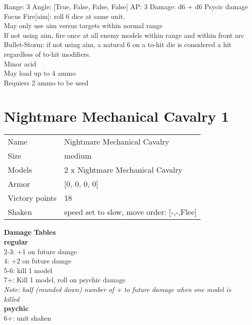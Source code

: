 Range: 3  Angle: [True, False, False, False] AP: 3 Damage: d6 + d6 Psycic damage \\
Focus Fire[aim]: roll 6 dice at same unit.\\ 
May only use aim versus targets within normal range\\ 
If not using aim, fire once at all enemy models within range and within front arc\\ 
Bullet-Storm: if not using aim, a natural 6 on a to-hit die is considered a hit regardless of to-hit modifiers.\\ 
Minor acid\\ 
May load up to 4 ammo\\ 
Requiers 2 ammo to be used\\ 




 















\clearpage

\section{ Nightmare Mechanical Cavalry 1 }

\begin{tabular}{ll}
  Name & Nightmare Mechanical Cavalry \\
  Size & medium\\
  Models & 2 x Nightmare Mechanical Cavalry\\
  Armor & [0, 0, 0, 0]\\
  Victory points & 18\\
  Shaken & speed set to slow, move order: [-,-,Flee]\\
\end{tabular}




{\bf Damage Tables} \\
 {\bf regular } \\
2-3: +1 on future damge \\
4: +2 on future damge \\
5-6: kill 1 model \\
7+: Kill 1 model, roll on psychic damage \\
{{\it Note: half (rounded down) number of + to future damage when one model is killed}} \\
 {\bf psychic } \\
6+: unit shaken \\


